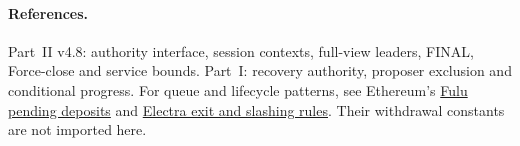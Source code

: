 \documentclass[11pt,a4paper]{article}
\begin{document}
\paragraph{References.}
Part~II v4.8: authority interface, session contexts, full-view leaders,
FINAL, Force-close and service bounds.
Part~I: recovery authority, proposer exclusion and conditional progress.
For queue and lifecycle patterns, see Ethereum's
\href{https://ethereum.github.io/consensus-specs/specs/fulu/beacon-chain/}{Fulu pending deposits}
and \href{https://ethereum.github.io/consensus-specs/specs/electra/beacon-chain/}{Electra exit and slashing rules}.
Their withdrawal constants are not imported here.
\end{document}
